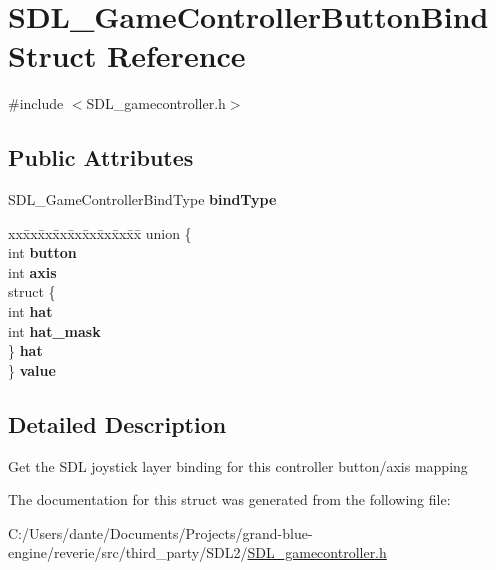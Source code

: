 \hypertarget{struct_s_d_l___game_controller_button_bind}{}\section{S\+D\+L\+\_\+\+Game\+Controller\+Button\+Bind Struct Reference}
\label{struct_s_d_l___game_controller_button_bind}


{\ttfamily \#include $<$S\+D\+L\+\_\+gamecontroller.\+h$>$}

\subsection*{Public Attributes}
\begin{DoxyCompactItemize}
\item 
\mbox{\label{struct_s_d_l___game_controller_button_bind_a032fd941b0e8e5e2cdf52b7597f559b9}} 
S\+D\+L\+\_\+\+Game\+Controller\+Bind\+Type {\bfseries bind\+Type}
\item 
\mbox{\label{struct_s_d_l___game_controller_button_bind_a4b3109685b384f6321146ab4c39855b1}} 
\begin{tabbing}
xx\=xx\=xx\=xx\=xx\=xx\=xx\=xx\=xx\=\kill
union \{\\
\>int {\bfseries button}\\
\>int {\bfseries axis}\\
\>struct \{\\
\>\>int {\bfseries hat}\\
\>\>int {\bfseries hat\_mask}\\
\>\} {\bfseries hat}\\
\} {\bfseries value}\\

\end{tabbing}\end{DoxyCompactItemize}


\subsection{Detailed Description}
Get the S\+DL joystick layer binding for this controller button/axis mapping 

The documentation for this struct was generated from the following file\+:\begin{DoxyCompactItemize}
\item 
C\+:/\+Users/dante/\+Documents/\+Projects/grand-\/blue-\/engine/reverie/src/third\+\_\+party/\+S\+D\+L2/\mbox{\hyperlink{_s_d_l__gamecontroller_8h}{S\+D\+L\+\_\+gamecontroller.\+h}}\end{DoxyCompactItemize}
